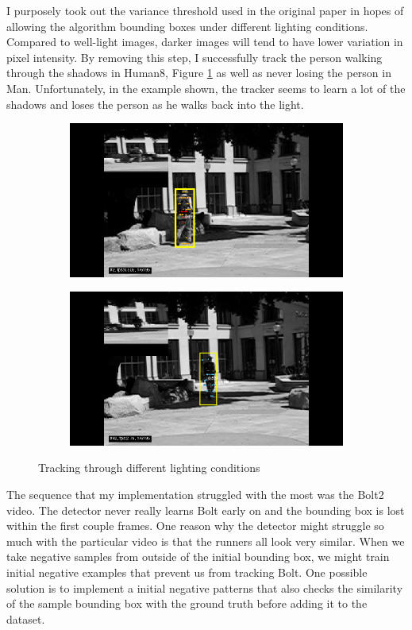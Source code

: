 \documentclass[10pt,twocolumn,letterpaper]{article}
\begin{document}
I purposely took out the variance threshold used in the original paper in hopes of allowing the algorithm bounding boxes under different lighting conditions. Compared to well-light images, darker images will tend to have lower variation in pixel intensity. By removing this step, I successfully track the person walking through the shadows in Human8, Figure \ref{fig:man} as well as never losing the person in Man. Unfortunately, in the example shown, the tracker seems to learn a lot of the shadows and loses the person as he walks back into the light. \\
\begin{figure}
\begin{centering}
\begin{subfigure}[b]{0.4\textwidth}
\includegraphics[width=\textwidth]{human1}
\end{subfigure}
\begin{subfigure}[b]{0.4\textwidth}
\includegraphics[width=\textwidth]{human2}
\end{subfigure}
\caption{Tracking through different lighting conditions}
\label{fig:man}
\end{centering}
\end{figure}
The sequence that my implementation struggled with the most was the Bolt2 video. The detector never really learns Bolt early on and the bounding box is lost within the first couple frames. One reason why the detector might struggle so much with the particular video is that the runners all look very similar. When we take negative samples from outside of the initial bounding box, we might train initial negative examples that prevent us from tracking Bolt. One possible solution is to implement a initial negative patterns that also checks the similarity of the sample bounding box with the ground truth before adding it to the dataset. 
\end{document}
